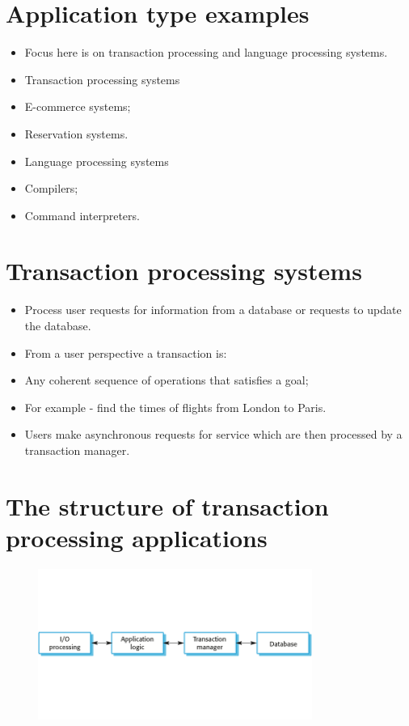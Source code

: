 \section{Application type examples}
\begin{itemize}
\item Focus here is on transaction processing and language processing systems.

\item Transaction processing systems  \item E-commerce systems;  \item Reservation systems.
\item Language processing systems  \item Compilers;
 \item Command interpreters.


\end{itemize}
\section{Transaction processing systems}
\begin{itemize}
\item Process user requests for information from a database or requests to update the database.

\item From a user perspective a transaction is:

 \item Any coherent sequence of operations that satisfies a goal;  \item For example - find the times of flights from London to Paris.
\item Users make asynchronous requests for service which are then processed by a transaction manager.


\end{itemize}
\section{The structure of transaction processing applications}
\begin{figure}[h!]
    \centering
    \includegraphics[width = 0.8\textwidth]{./figures/L3_9.png}
    \caption{}
    \label{fig:L3_9}
\end{figure}




